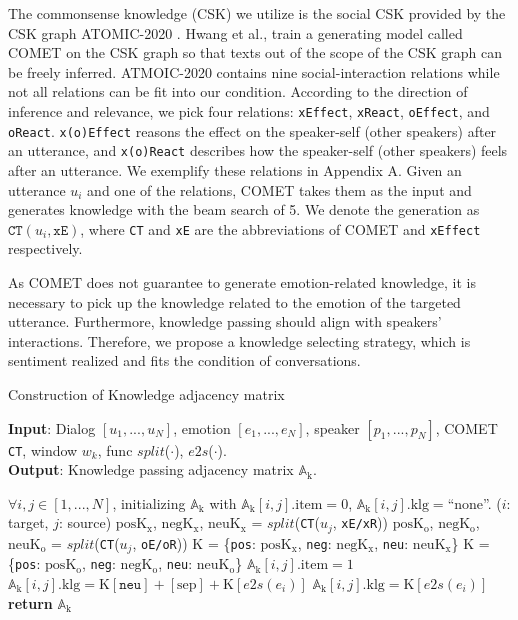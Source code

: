 \documentclass{article}
\begin{document}
The commonsense knowledge (CSK) we utilize is the social CSK provided by the CSK graph ATOMIC-2020 \cite{ATOMIC2020}. Hwang et al.,  train a generating model called COMET \cite{COMET} on the CSK graph so that texts out of the scope of the CSK graph can be freely inferred. ATMOIC-2020 contains nine social-interaction relations while not all relations can be fit into our condition. According to the direction of inference and relevance, we pick four relations: \texttt{xEffect}, \texttt{xReact}, \texttt{oEffect}, and \texttt{oReact}. \texttt{x(o)Effect} reasons the effect on the speaker-self (other speakers) after an utterance, and \texttt{x(o)React} describes how the speaker-self (other speakers) feels after an utterance. We exemplify these relations in Appendix A. Given an utterance $u_i$ and one of the relations, COMET takes them as the input and generates knowledge with the beam search of 5. We denote the generation as $\texttt{CT}(u_i, \texttt{xE})$, where \texttt{CT} and \texttt{xE} are the abbreviations of COMET and \texttt{xEffect} respectively. 

As COMET does not guarantee to generate emotion-related knowledge, it is necessary to pick up the knowledge related to the emotion of the targeted utterance. Furthermore, knowledge passing should align with speakers' interactions. Therefore, we propose a knowledge selecting strategy, which is sentiment realized and fits the condition of conversations. 

\begin{algorithm}[tb]
\caption{Construction of Knowledge adjacency matrix}
\label{alg:algorithm}
\textbf{Input}: Dialog $[u_1,...,u_N]$, emotion $[e_1,...,e_N]$, speaker $[p_1,...,p_N]$, COMET \texttt{CT}, window $w_k$, func $split$($\cdot$), $e2s$($\cdot$).\\
\textbf{Output}: Knowledge passing adjacency matrix $\mathrm{\mathbb{A}_k}$. 

\begin{algorithmic}[1] \STATE $\forall i,j\in [1,...,N]$, initializing $\mathrm{\mathbb{A}_k}$ with $\mathrm{\mathbb{A}_k}[i,j].\mathrm{item}=0$, $\mathrm{\mathbb{A}_k}[i,j].\mathrm{klg}=$``none''. ($i$: target, $j$: source)
\STATE $\mathrm{posK_{x}}$, $\mathrm{negK_{x}}$, $\mathrm{neuK_{x}}$ = $split$(\texttt{CT}($u_j$, \texttt{xE/xR}))
\STATE $\mathrm{posK_{o}}$, $\mathrm{negK_{o}}$, $\mathrm{neuK_{o}}$ = $split$(\texttt{CT}($u_j$, \texttt{oE/oR}))
\STATE $\mathrm{K}$ = \{\texttt{pos}: $\mathrm{posK_{x}}$, \texttt{neg}: $\mathrm{negK_{x}}$, \texttt{neu}: $\mathrm{neuK_{x}}$\}
\ELSE 
\STATE $\mathrm{K}$ = \{\texttt{pos}: $\mathrm{posK_{o}}$, \texttt{neg}: $\mathrm{negK_{o}}$, \texttt{neu}: $\mathrm{neuK_{o}}$\}
\ENDIF
{}
\STATE $\mathrm{\mathbb{A}_k}[i,j].\mathrm{item}=1$
\STATE $\mathrm{\mathbb{A}_k}[i,j].\mathrm{klg}=\mathrm{K}[\texttt{neu}]+[\mathrm{sep}]+\mathrm{K}[e2s(e_i)]$
\ELSE
\STATE $\mathrm{\mathbb{A}_k}[i,j].\mathrm{klg}=\mathrm{K}[e2s(e_i)]$
\ENDIF
\ENDIF
\ENDFOR
\ENDFOR
\STATE \textbf{return} $\mathrm{\mathbb{A}_k}$
\end{algorithmic}
\end{algorithm}
\end{document}
